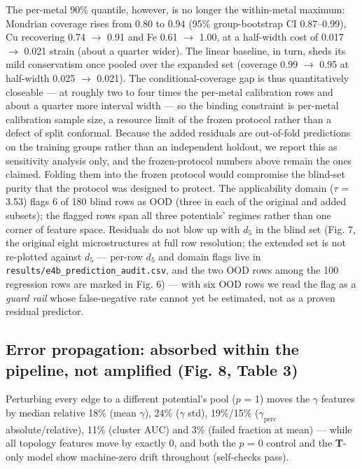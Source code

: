 \documentclass[11pt]{article}
\begin{document}
The per-metal 90\% quantile, however, is no longer the within-metal maximum: Mondrian coverage rises from 0.80 to 0.94 (95\% group-bootstrap CI 0.87--0.99), Cu recovering 0.74 $\rightarrow$ 0.91 and Fe 0.61 $\rightarrow$ 1.00, at a half-width cost of 0.017 $\rightarrow$ 0.021 strain (about a quarter wider). The linear baseline, in turn, sheds its mild conservatism once pooled over the expanded set (coverage 0.99 $\rightarrow$ 0.95 at half-width 0.025 $\rightarrow$ 0.021). The conditional-coverage gap is thus quantitatively closeable --- at roughly two to four times the per-metal calibration rows and about a quarter more interval width --- so the binding constraint is per-metal calibration sample size, a resource limit of the frozen protocol rather than a defect of split conformal. Because the added residuals are out-of-fold predictions on the training groups rather than an independent holdout, we report this as sensitivity analysis only, and the frozen-protocol numbers above remain the ones claimed. Folding them into the frozen protocol would compromise the blind-set purity that the protocol was designed to protect. The applicability domain ($\tau$ = 3.53) flags 6 of 180 blind rows as OOD (three in each of the original and added subsets); the flagged rows span all three potentials' regimes rather than one corner of feature space. Residuals do not blow up with $d_5$ in the blind set (Fig. 7, the original eight microstructures at full row resolution; the extended set is not re-plotted against $d_5$ --- per-row $d_5$ and domain flags live in \texttt{results/e4b\_prediction\_audit.csv}, and the two OOD rows among the 100 regression rows are marked in Fig. 6) --- with six OOD rows we read the flag as a \textit{guard rail} whose false-negative rate cannot yet be estimated, not as a proven residual predictor.

\subsection{Error propagation: absorbed within the pipeline, not amplified (Fig. 8, Table 3)}

Perturbing every edge to a different potential's pool ($p$ = 1) moves the $\gamma$ features by median relative 18\% (mean $\gamma$), 24\% ($\gamma$ std), 19\%/15\% ($\gamma_{\mathrm{perc}}$ absolute/relative), 11\% (cluster AUC) and 3\% (failed fraction at mean) --- while all topology features move by exactly 0, and both the $p$ = 0 control and the \textbf{T}-only model show machine-zero drift throughout (self-checks pass).
\end{document}
